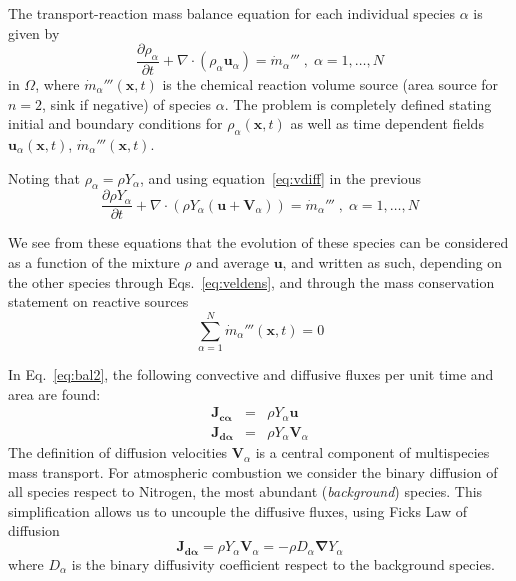 The transport-reaction mass balance equation for each individual species $\alpha$ is given by
%
\begin{equation}
   \frac{\partial \rho_\alpha}{ \partial t} + \nabla \cdot (\rho_\alpha  \mathbf{u}_\alpha) = \dot{m}_\alpha''' \; , \; \alpha=1,\dots,N \label{eq:bal}
\end{equation}
%
in $\Omega$, where $\dot{m}_\alpha'''(\mathbf{x},t)$ is the chemical reaction volume source (area source for $n=2$, sink if negative) of species $\alpha$. The problem is completely defined stating initial and boundary conditions for $\rho_\alpha(\mathbf{x},t)$ as well as time dependent fields $\mathbf{u}_\alpha(\mathbf{x},t)$, $\dot{m}_\alpha'''(\mathbf{x},t)$.

Noting that $ \rho_\alpha = \rho Y_\alpha$, and using equation~\eqref{eq:vdiff} in the previous
%
\begin{equation}
   \frac{\partial \rho Y_\alpha}{ \partial t} + \nabla \cdot \left( \rho Y_\alpha  (\mathbf{u}+\mathbf{V}_\alpha) \right) = \dot{m}_\alpha''' \; , \; \alpha=1,\dots,N \label{eq:bal2}
\end{equation}
%

We see from these equations that the evolution of these species can be considered as a function of the mixture $\rho$ and average $\mathbf{u}$, and written as such, depending on the other species through Eqs.~\eqref{eq:veldens}, and through the mass conservation statement on reactive sources
%
\begin{equation}
  \sum\limits_{\alpha=1}^{N} \dot{m}_\alpha'''(\mathbf{x},t) = 0
\end{equation}
%

In Eq.~\eqref{eq:bal2}, the following convective and diffusive fluxes per unit time and area are found:
%
\begin{eqnarray}
  \mathbf{J_{c \alpha}} &=& \rho Y_\alpha  \mathbf{u} \label{eq:jc} \\
  \mathbf{J_{d \alpha}} &=& \rho Y_\alpha  \mathbf{V}_\alpha \label{eq:jd}
\end{eqnarray}
%
The definition of diffusion velocities $\mathbf{V}_\alpha$ is a central component of multispecies mass transport. For atmospheric combustion we consider the binary diffusion of all species respect to Nitrogen, the most abundant (\textit{background}) species. This simplification allows us to uncouple the diffusive fluxes, using Ficks Law of diffusion
%
\begin{equation}
   \mathbf{J_{d \alpha}} = \rho Y_\alpha  \mathbf{V}_\alpha = - \rho D_\alpha \boldsymbol{\nabla} Y_\alpha
\end{equation}
%
where $D_\alpha$ is the binary diffusivity coefficient respect to the background species.

